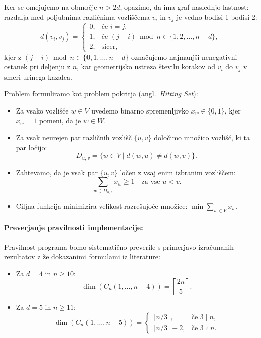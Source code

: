 \documentclass[a4paper,12pt]{article}
\theoremstyle{definition}
\begin{document}
Ker se omejujemo na območje $n > 2d$, opazimo, da ima graf naslednjo lastnost: razdalja med poljubnima različnima 
vozliščema $v_i$ in $v_j$ je vedno bodisi 1 bodisi 2:
\[
d(v_i, v_j) = 
\begin{cases}
0, & \text{če } i = j, \\
1, & \text{če } (j - i) \bmod n \in \{1, 2, \dots, n-d\}, \\
2, & \text{sicer},
\end{cases}
\]
kjer z $(j - i) \bmod n \in \{0, 1, \dots, n-d\}$ označujemo najmanjši nenegativni ostanek pri deljenju z $n$, kar 
geometrijsko ustreza številu korakov od $v_i$ do $v_j$ v smeri urinega kazalca.

Problem formuliramo kot problem pokritja (angl.~\emph{Hitting Set}):
\begin{itemize}
    \item Za vsako vozlišče $w \in V$ uvedemo binarno spremenljivko $x_w \in \{0, 1\}$, kjer $x_w = 1$ pomeni, da je $w \in W$.
    \item Za vsak neurejen par različnih vozlišč $\{u, v\}$ določimo množico vozlišč, ki ta par ločijo:
    \[
    D_{u,v} = \{w \in V \mid d(w, u) \neq d(w, v)\}.
    \]
    \item Zahtevamo, da je vsak par $\{u, v\}$ ločen z vsaj enim izbranim vozliščem:
    \[
    \sum_{w \in D_{u,v}} x_w \geq 1 \quad \text{za vse } u < v.
    \]
    \item Ciljna funkcija minimizira velikost razrešujoče množice: $\min \sum_{w \in V} x_w$.
\end{itemize}

\paragraph{Preverjanje pravilnosti implementacije:}
Pravilnost programa bomo sistematično preverile s primerjavo izračunanih rezultatov z že dokazanimi formulami iz 
literature:

\begin{itemize}
    \item Za $d = 4$ in $n \geq 10$:
    \[
    \operatorname{dim}(C_n(1, \dots, n-4)) = \left\lceil \frac{2n}{5} \right\rceil.
    \]
    \item Za $d = 5$ in $n \geq 11$:
    \[
    \operatorname{dim}(C_n(1, \dots, n-5)) = 
    \begin{cases}
    \lfloor n/3 \rfloor, & \text{če } 3 \mid n, \\
    \lfloor n/3 \rfloor + 2, & \text{če } 3 \nmid n.
    \end{cases}
    \]
\end{itemize}
\end{document}
